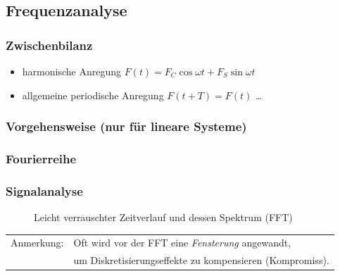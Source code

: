 \documentclass[hyperref={pdfpagemode=FullScreen, colorlinks=false}]{beamer}
\begin{document}
\maketitle

\subsection{Frequenzanalyse}

\begin{frame}
\frametitle{Zwischenbilanz}



\begin{itemize}[<+->]
 \item harmonische Anregung $F(t)=  F_C\cos\omega t + F_S\sin\omega t$ {\Large \color{green}\checkmark}
 \item allgemeine periodische Anregung $F(t+T)=F(t)$ \dots
\end{itemize}
\end{frame}

\begin{frame}
\frametitle{Vorgehensweise \normalsize{(nur für lineare Systeme)}}



\end{frame}


\subsubsection{Fourierreihe}

\begin{frame}
\frametitle{Signalanalyse} 

\begin{figure}
   \setlength{\figW}{6.5cm} 
   \setlength{\figH}{5.2cm}
   
\caption*{Leicht verrauschter Zeitverlauf und dessen Spektrum (FFT)}
\end{figure}

\begin{tabular}{ll}
Anmerkung: & Oft wird vor der FFT eine \textsl{Fensterung} angewandt,  \\
 & um Diskretisierungseffekte zu kompensieren (Kompromiss).\\
\end{tabular}

\end{frame}
\end{document}
